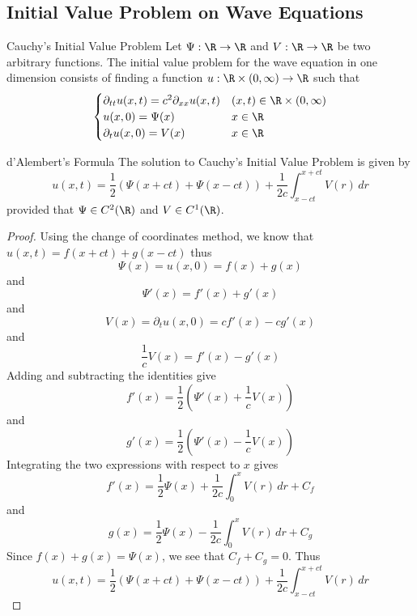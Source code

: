 \documentclass[a4paper]{article}
\begin{document}
\subsection{Initial Value Problem on Wave Equations}
\begin{defn}{Cauchy's Initial Value Problem}{} Let $\Psi:\R\to\R$ and $V:\R\to\R$ be two arbitrary functions. The initial value problem for the wave equation in one dimension consists of finding a function $u:\R\times(0,\infty)\to\R$ such that $$\begin{cases}
\partial_{tt}u(x,t)=c^2\partial_{xx}u(x,t) & (x,t)\in\R\times(0,\infty)\\
u(x,0)=\Psi(x) & x\in\R\\
\partial_tu(x,0)=V(x) & x\in\R
\end{cases}$$
\end{defn}

\begin{prp}{d'Alembert's Formula}{} The solution to Cauchy's Initial Value Problem is given by $$u(x,t)=\frac{1}{2}\left(\Psi(x+ct)+\Psi(x-ct)\right)+\frac{1}{2c}\int_{x-ct}^{x+ct}V(r)\,dr$$ provided that $\Psi\in C^2(\R)$ and $V\in C^1(\R)$. \tcbline
\begin{proof} Using the change of coordinates method, we know that $u(x,t)=f(x+ct)+g(x-ct)$ thus $$\Psi(x)=u(x,0)=f(x)+g(x)$$ and $$\Psi'(x)=f'(x)+g'(x)$$ and $$V(x)=\partial_tu(x,0)=cf'(x)-cg'(x)$$ and $$\frac{1}{c}V(x)=f'(x)-g'(x)$$ Adding and subtracting the identities give $$f'(x)=\frac{1}{2}(\Psi'(x)+\frac{1}{c}V(x))$$ and $$g'(x)=\frac{1}{2}(\Psi'(x)-\frac{1}{c}V(x))$$ Integrating the two expressions with respect to $x$ gives $$f'(x)=\frac{1}{2}\Psi(x)+\frac{1}{2c}\int_0^xV(r)\,dr+C_f$$ and $$g(x)=\frac{1}{2}\Psi(x)-\frac{1}{2c}\int_0^xV(r)\,dr+C_g$$ Since $f(x)+g(x)=\Psi(x)$, we see that $C_f+C_g=0$. Thus $$u(x,t)=\frac{1}{2}\left(\Psi(x+ct)+\Psi(x-ct)\right)+\frac{1}{2c}\int_{x-ct}^{x+ct}V(r)\,dr$$
\end{proof}
\end{prp}
\end{document}
